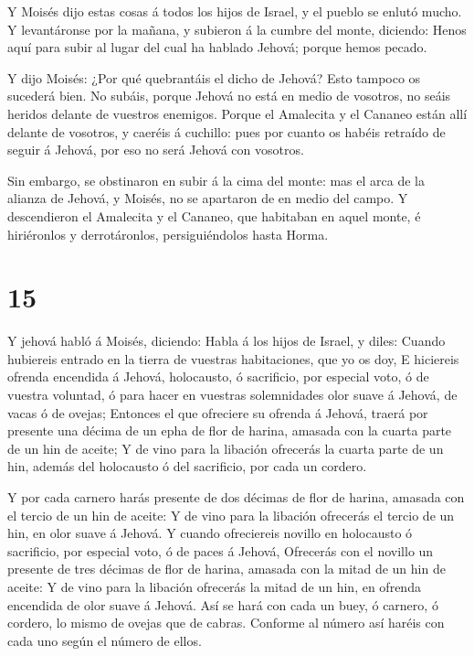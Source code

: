  Y Moisés dijo estas cosas á todos los hijos de Israel, y
el pueblo se enlutó mucho.  Y levantáronse por la mañana, y
subieron á la cumbre del monte, diciendo: Henos aquí para subir al lugar
del cual ha hablado Jehová; porque hemos pecado.

 Y dijo Moisés: ¿Por qué quebrantáis el dicho de Jehová?
Esto tampoco os sucederá bien.  No subáis, porque Jehová no
está en medio de vosotros, no seáis heridos delante de vuestros
enemigos.  Porque el Amalecita y el Cananeo están allí
delante de vosotros, y caeréis á cuchillo: pues por cuanto os habéis
retraído de seguir á Jehová, por eso no será Jehová con vosotros.

 Sin embargo, se obstinaron en subir á la cima del monte:
mas el arca de la alianza de Jehová, y Moisés, no se apartaron de en
medio del campo.  Y descendieron el Amalecita y el Cananeo,
que habitaban en aquel monte, é hiriéronlos y derrotáronlos,
persiguiéndolos hasta Horma.

\hypertarget{section-14}{%
\section{15}\label{section-14}}

 Y jehová habló á Moisés, diciendo:  Habla á los
hijos de Israel, y diles: Cuando hubiereis entrado en la tierra de
vuestras habitaciones, que yo os doy,  E hiciereis ofrenda
encendida á Jehová, holocausto, ó sacrificio, por especial voto, ó de
vuestra voluntad, ó para hacer en vuestras solemnidades olor suave á
Jehová, de vacas ó de ovejas;  Entonces el que ofreciere su
ofrenda á Jehová, traerá por presente una décima de un epha de flor de
harina, amasada con la cuarta parte de un hin de aceite;  Y
de vino para la libación ofrecerás la cuarta parte de un hin, además del
holocausto ó del sacrificio, por cada un cordero.

 Y por cada carnero harás presente de dos décimas de flor de
harina, amasada con el tercio de un hin de aceite:  Y de
vino para la libación ofrecerás el tercio de un hin, en olor suave á
Jehová.  Y cuando ofreciereis novillo en holocausto ó
sacrificio, por especial voto, ó de paces á Jehová, 
Ofrecerás con el novillo un presente de tres décimas de flor de harina,
amasada con la mitad de un hin de aceite:  Y de vino para
la libación ofrecerás la mitad de un hin, en ofrenda encendida de olor
suave á Jehová.  Así se hará con cada un buey, ó carnero, ó
cordero, lo mismo de ovejas que de cabras.  Conforme al
número así haréis con cada uno según el número de ellos.

